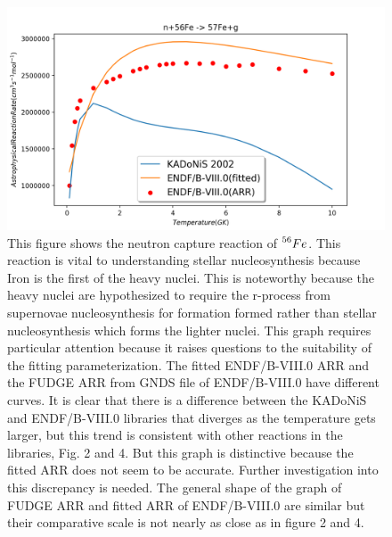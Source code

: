 \documentclass{article}
\begin{document}
\begin{figure}
\includegraphics[width=\linewidth]{Fe56final.png}
  \caption{This figure shows the neutron capture reaction of $\prescript{56}{}{Fe}$. This reaction is vital to understanding stellar nucleosynthesis because Iron is the first of the heavy nuclei. This is noteworthy because the heavy nuclei are hypothesized to require the r-process from supernovae nucleosynthesis for formation formed rather than stellar nucleosynthesis which forms the lighter nuclei. This graph requires particular attention because it raises questions to the suitability of the fitting parameterization. The fitted ENDF/B-VIII.0 ARR and the FUDGE ARR from GNDS file of ENDF/B-VIII.0 have different curves. It is clear that there is a difference between the KADoNiS and ENDF/B-VIII.0 libraries that diverges as the temperature gets larger, but this trend is consistent with other reactions in the libraries, Fig. 2 and 4. But this graph is distinctive because the fitted ARR does not seem to be accurate. Further investigation into this discrepancy is needed. The general shape of the graph of FUDGE ARR and fitted ARR of ENDF/B-VIII.0 are similar but their comparative scale is not nearly as close as in figure 2 and 4.} 
  \label{Figure 3}
\end{figure}
\end{document}

